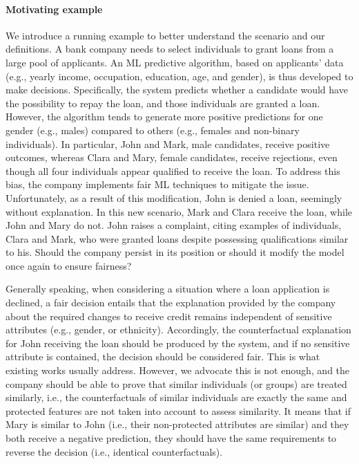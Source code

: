 \documentclass[letterpaper]{article} %
\begin{document}
\paragraph{Motivating example}
We introduce a running example to better understand the scenario and our definitions. A bank company needs to select individuals to grant loans from a large pool of applicants. An ML predictive algorithm, based on applicants' data (e.g., yearly income, occupation, education, age, and gender), is thus developed to make decisions. Specifically, the system predicts whether a candidate would have the possibility to repay the loan, and those individuals are granted a loan. However, the algorithm tends to generate more positive predictions for one gender (e.g., males) compared to others (e.g., females and non-binary individuals). In particular, John and Mark, male candidates, receive positive outcomes, whereas Clara and Mary, female candidates, receive rejections, even though all four individuals appear qualified to receive the loan. To address this bias, the company implements fair ML techniques to mitigate the issue. Unfortunately, as a result of this modification, John is denied a loan, seemingly without explanation. In this new scenario, Mark and Clara receive the loan, while John and Mary do not. John raises a complaint, citing examples of individuals, Clara and Mark, who were granted loans despite possessing qualifications similar to his. Should the company persist in its position or should it modify the model once again to ensure fairness?

Generally speaking, when considering a situation where a loan application is declined, a fair decision entails that the explanation provided by the company about the required changes to receive credit remains independent of sensitive attributes (e.g., gender, or ethnicity). Accordingly, the counterfactual explanation for John receiving the loan should be produced by the system, and if no sensitive attribute is contained, the decision should be considered fair. This is what existing works usually address.
%
However, we advocate this is not enough, and the company should be able to prove that similar individuals (or groups) are treated similarly, i.e., the counterfactuals of similar individuals are exactly the same and protected features are not taken into account to assess similarity. It means that if Mary is similar to John (i.e., their non-protected attributes are similar) and they both receive a negative prediction, they should have the same requirements to reverse the decision (i.e., identical counterfactuals).
\end{document}
